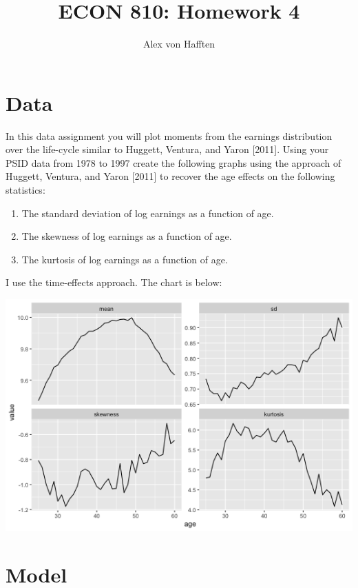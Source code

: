 \documentclass{article}
\title{ECON 810: Homework 4}
\author{Alex von Hafften }
\begin{document}
\maketitle

\section{Data}

In this data assignment you will plot moments from the earnings distribution over the life-cycle similar to Huggett, Ventura, and Yaron [2011]. Using your PSID data from 1978 to 1997 create the following graphs using the approach of Huggett, Ventura, and Yaron [2011] to recover the age effects on the following statistics:

\begin{enumerate}

\item The standard deviation of log earnings as a function of age.

\item The skewness of log earnings as a function of age.

\item The kurtosis of log earnings as a function of age.

\end{enumerate}

I use the time-effects approach.  The chart is below:

\begin{center}
\includegraphics[scale = 0.75]{part_1}
\end{center}

\pagebreak

\section{Model}
\end{document}
